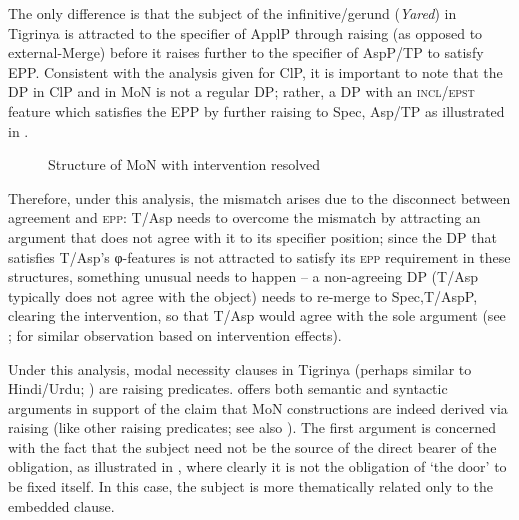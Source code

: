 \documentclass[output=paper]{langscibook}
\begin{document}
The only difference is that the subject of the infinitive/gerund (\emph{Yared}) in Tigrinya is attracted to the specifier of ApplP through raising (as opposed to external-Merge) before it raises further to the specifier of AspP/TP to satisfy EPP. Consistent with the  analysis given for ClP, it is important to note that the DP in ClP and in MoN is not a regular DP; rather, a DP with an {\scshape incl/epst} feature which satisfies the EPP by further raising to Spec, Asp/TP as illustrated in . 

\begin{figure} 
\caption{Structure of MoN with intervention resolved\label{fig:Gebregziabher:interventionTree2}}
\end{figure} 

Therefore, under this analysis, the mismatch arises due to the disconnect between agreement and {\scshape epp}: T/Asp needs to overcome the mismatch by attracting an argument that does not agree with it to its specifier position; since the DP that satisfies T/Asp's φ-features is not attracted to satisfy its {\scshape epp} requirement in these structures, something unusual needs to happen -- a non-agreeing DP (T/Asp typically does not agree with the object) needs to re-merge to Spec,T/AspP, clearing the intervention, so that T/Asp would agree with the sole argument (see \citealt{rezac2008}; \citealt{ana05} for similar observation based on intervention effects).

Under this analysis, modal necessity clauses in Tigrinya (perhaps similar to Hindi\slash Urdu; \citealt{bhatt97}) are raising predicates. \citet{bhatt97} offers both semantic and syntactic arguments in support of the claim that MoN constructions are indeed derived via raising (like other raising predicates; see also \citealt{landau2010}). The first argument is concerned with the fact that the subject need not be the source of the direct bearer of the obligation, as illustrated in , where clearly it is not the obligation of `the door' to be fixed itself. In this case, the subject is more thematically related only to the embedded clause.
\end{document}
